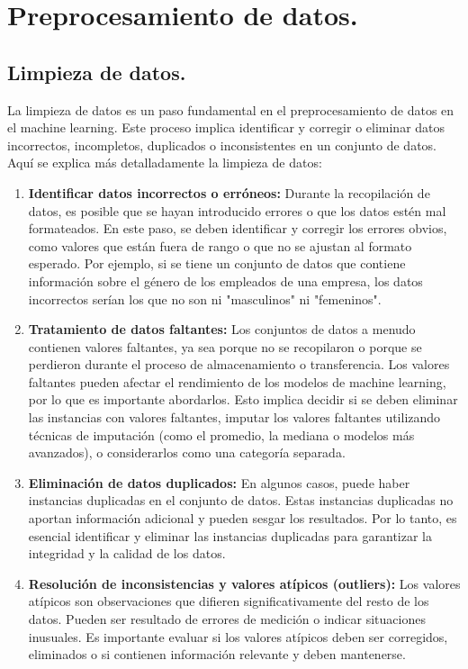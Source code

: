\documentclass[../main.tex]{subfiles}
\begin{document}

\section{Preprocesamiento de datos.}
    \subsection*{Limpieza de datos.}
        La limpieza de datos es un paso fundamental en el preprocesamiento de datos en el machine learning. Este proceso implica identificar y corregir o eliminar datos incorrectos, incompletos, duplicados o inconsistentes en un conjunto de datos. Aquí se explica más detalladamente la limpieza de datos:

        \begin{enumerate}
            \item \textbf{Identificar datos incorrectos o erróneos:} Durante la recopilación de datos, es posible que se hayan introducido errores o que los datos estén mal formateados. En este paso, se deben identificar y corregir los errores obvios, como valores que están fuera de rango o que no se ajustan al formato esperado. Por ejemplo, si se tiene un conjunto de datos que contiene información sobre el género de los empleados de una empresa, los datos incorrectos serían los que no son ni "masculinos" ni "femeninos".
            \item \textbf{Tratamiento de datos faltantes:} Los conjuntos de datos a menudo contienen valores faltantes, ya sea porque no se recopilaron o porque se perdieron durante el proceso de almacenamiento o transferencia. Los valores faltantes pueden afectar el rendimiento de los modelos de machine learning, por lo que es importante abordarlos. Esto implica decidir si se deben eliminar las instancias con valores faltantes, imputar los valores faltantes utilizando técnicas de imputación (como el promedio, la mediana o modelos más avanzados), o considerarlos como una categoría separada.
            \item \textbf{Eliminación de datos duplicados:} En algunos casos, puede haber instancias duplicadas en el conjunto de datos. Estas instancias duplicadas no aportan información adicional y pueden sesgar los resultados. Por lo tanto, es esencial identificar y eliminar las instancias duplicadas para garantizar la integridad y la calidad de los datos.
            \item \textbf{Resolución de inconsistencias y valores atípicos (outliers):} Los valores atípicos son observaciones que difieren significativamente del resto de los datos. Pueden ser resultado de errores de medición o indicar situaciones inusuales. Es importante evaluar si los valores atípicos deben ser corregidos, eliminados o si contienen información relevante y deben mantenerse.

\end{enumerate}
\end{document}
